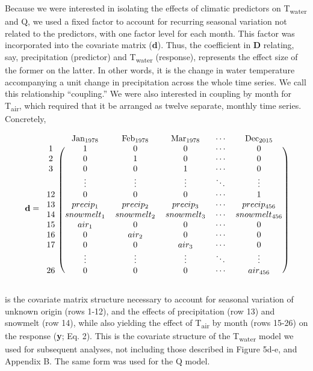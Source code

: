 \documentclass[notitlepage]{article}
\begin{document}
Because we were interested in isolating the effects of climatic predictors on T\textsubscript{water} and Q, we used a fixed factor to account for recurring seasonal variation not related to the predictors, with one factor level for each month. This factor was incorporated into the covariate matrix (\textbf{d}). Thus, the coefficient in \textbf{D} relating, say, precipitation (predictor) and T\textsubscript{water} (response), represents the effect size of the former on the latter. In other words, it is the change in water temperature accompanying a unit change in precipitation across the whole time series. We call this relationship ``coupling.'' We were also interested in coupling by month for T\textsubscript{air}, which required that it be arranged as twelve separate, monthly time series. Concretely,

$$
\textbf{d} = \begin{blockarray}{cccccc}
& \textrm{Jan}_{1978} & \textrm{Feb}_{1978} & \textrm{Mar}_{1978} & \cdots & \textrm{Dec}_{2015} \\
\begin{block}{c(ccccc)}
    1 & 1 & 0 & 0 & \cdots & 0 \\
    2 & 0 & 1 & 0 & \cdots & 0 \\
    3 & 0 & 0 & 1 & \cdots & 0 \\
      & \vdots & \vdots & \vdots & \ddots & \vdots \\
    12 & 0 & 0 & 0 & \cdots & 1 \\
    13 & precip_1 & precip_2 & precip_3 & \cdots & precip_{456} \\
    14 & snowmelt_1 & snowmelt_2 & snowmelt_3 & \cdots & snowmelt_{456} \\
    15 & air_1 & 0 & 0 & \cdots & 0 \\
    16 & 0 & air_2 & 0 & \cdots & 0 \\
    17 & 0 & 0 & air_3 & \cdots & 0 \\
      & \vdots & \vdots & \vdots & \ddots & \vdots \\
    26 & 0 & 0 & 0 & \cdots & air_{456} \\
\end{block}
\end{blockarray}
$$

\noindent
is the covariate matrix structure necessary to account for seasonal variation of unknown origin (rows 1-12), and the effects of precipitation (row 13) and snowmelt (row 14), while also yielding the effect of T\textsubscript{air} by month (rows 15-26) on the response (\textbf{y}; Eq. 2). This is the covariate structure of the T\textsubscript{water} model we used for subsequent analyses, not including those described in Figure 5d-e, and Appendix B. The same form was used for the Q model.
\end{document}
